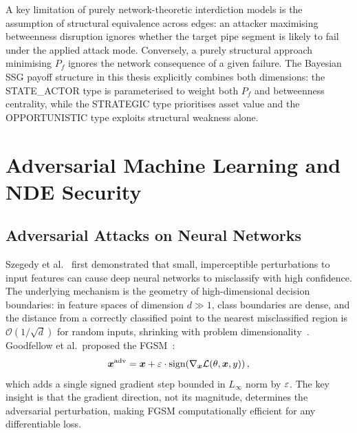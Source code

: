 A key limitation of purely network-theoretic interdiction models is the
assumption of structural equivalence across edges: an attacker maximising
betweenness disruption ignores whether the target pipe segment is likely
to fail under the applied attack mode.  Conversely, a purely structural
approach minimising $P_f$ ignores the network consequence of a given
failure.  The Bayesian SSG payoff structure in this thesis explicitly
combines both dimensions: the STATE\_ACTOR type is parameterised to
weight both $P_f$ and betweenness centrality, while the STRATEGIC type
prioritises asset value and the OPPORTUNISTIC type exploits structural
weakness alone.

\section{Adversarial Machine Learning and NDE Security}
\label{sec:lit_adv}

\subsection{Adversarial Attacks on Neural Networks}
\label{subsec:lit_adv_basics}

Szegedy et al.~\cite{Szegedy2014} first demonstrated that small,
imperceptible perturbations to input features can cause deep neural
networks to misclassify with high confidence.  The underlying mechanism
is the geometry of high-dimensional decision boundaries: in feature
spaces of dimension $d \gg 1$, class boundaries are dense, and the
distance from a correctly classified point to the nearest misclassified
region is $\mathcal{O}(1/\sqrt{d})$ for random inputs, shrinking with
problem dimensionality~\cite{Goodfellow2016}.  Goodfellow et al.\
proposed the \acf{FGSM}~\cite{Goodfellow2015}:
\begin{equation}
  \bm{x}^\mathrm{adv} = \bm{x} + \varepsilon \cdot \mathrm{sign}
    \!\left(\nabla_{\bm{x}} \mathcal{L}(\theta, \bm{x}, y)\right),
  \label{eq:fgsm}
\end{equation}
which adds a single signed gradient step bounded in $L_\infty$ norm by
$\varepsilon$.  The key insight is that the gradient direction, not its
magnitude, determines the adversarial perturbation, making FGSM
computationally efficient for any differentiable loss.

